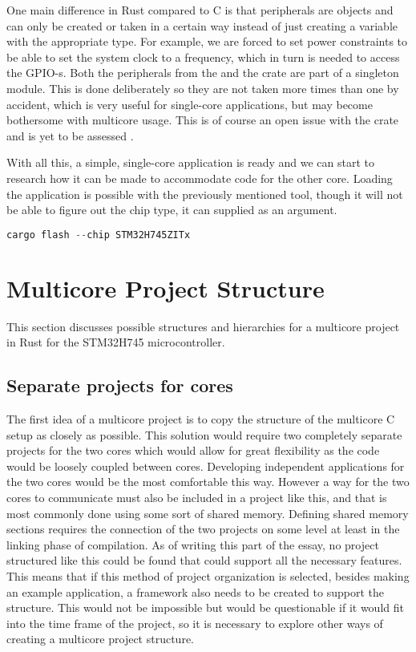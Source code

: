 One main difference in Rust compared to C is that peripherals are objects and can only be created or taken in a certain way instead of just creating a variable with the appropriate type. For example, we are forced to set power constraints to be able to set the system clock to a frequency, which in turn is needed to access the GPIO-s. Both the peripherals from the  and the  crate are part of a singleton module. This is done deliberately so they are not taken more times than one by accident, which is very useful for single-core applications, but may become bothersome with multicore usage. This is of course an open issue with the  crate and is yet to be assessed \cite{MulticorePeripherals}.

With all this, a simple, single-core application is ready and we can start to research how it can be made to accommodate code for the other core. Loading the application is possible with the previously mentioned  tool, though it will not be able to figure out the chip type, it can supplied as an argument.

\begin{lstlisting}[language=C,frame=single,float=!ht,label={lst:cargo-flash-1},caption={Flashing the Image with Cargo Flash}]
    cargo flash --chip STM32H745ZITx
\end{lstlisting}

\section{Multicore Project Structure}

This section discusses possible structures and hierarchies for a multicore project in Rust for the STM32H745 microcontroller.

\subsection{Separate projects for cores}

The first idea of a multicore project is to copy the structure of the multicore C setup as closely as possible. This solution would require two completely separate projects for the two cores which would allow for great flexibility as the code would be loosely coupled between cores. Developing independent applications for the two cores would be the most comfortable this way. However a way for the two cores to communicate must also be included in a project like this, and that is most commonly done using some sort of shared memory. Defining shared memory sections requires the connection of the two projects on some level at least in the linking phase of compilation. As of writing this part of the essay, no project structured like this could be found that could support all the necessary features. This means that if this method of project organization is selected, besides making an example application, a framework also needs to be created to support the structure. This would not be impossible but would be questionable if it would fit into the time frame of the project, so it is necessary to explore other ways of creating a multicore project structure.


